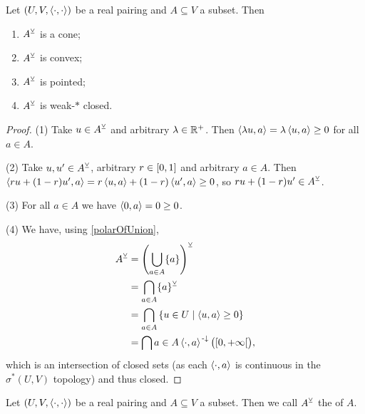 \begin{lemma} \label{dualConeProperties}
Let $\sSet{U,V,\pair{\cdot,\cdot}}$ be a real pairing and $A\subseteq V$ a subset. Then
\begin{enumerate}
\item $A^\veebar$ is a cone;
\item $A^\veebar$ is convex;
\item $A^\veebar$ is pointed;
\item $A^\veebar$ is weak-$*$ closed.
\end{enumerate}
\end{lemma}
\begin{proof}
(1) Take $u\in A^\veebar$ and arbitrary $\lambda\in\mathbb{R}^+$. Then $\left\langle \lambda u, a \right\rangle = \lambda \left\langle u, a \right\rangle \geq 0$ for all $a\in A$.

(2) Take $u,u'\in A^\veebar$, arbitrary $r\in \interval{0,1}$ and arbitrary $a\in A$. Then $\left\langle ru+ (1-r)u', a \right\rangle = r\left\langle u, a \right\rangle+ (1-r)\left\langle u', a \right\rangle \geq 0$, so $ru+(1-r)u'\in A^\veebar$.

(3) For all $a\in A$ we have $\left\langle 0, a \right\rangle = 0 \geq 0$.

(4) We have, using \ref{polarOfUnion},
\begin{align*}
A^\pairingAligned &= \left(\bigcup_{a\in A}\{a\}\right)^\pairingAligned \\
&= \bigcap_{a\in A} \{a\}^\pairingAligned \\
&= \bigcap_{a\in A}\setbuilder{u\in U}{\pair{u,a}\geq 0} \\
&= \bigcap{a\in A}\pair{\cdot, a}^{\preimf}\big(\interval[co]{0,+\infty}\big),
\end{align*}
which is an intersection of closed sets (as each $\left\langle \cdot, a \right\rangle$ is continuous in the $\sigma^*(U,V)$ topology) and thus closed.
\end{proof}

\begin{definition}
Let $\sSet{U,V,\pair{\cdot,\cdot}}$ be a real pairing and $A\subseteq V$ a subset. Then we call $A^\veebar$ the  of $A$.
\end{definition}

